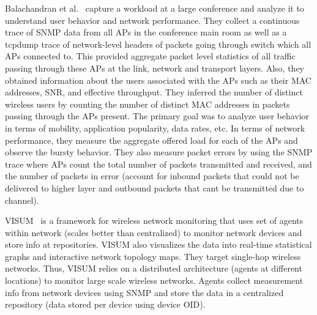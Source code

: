 Balachandran et al.~\cite{Balachandran-sigmetrics} capture a workload at a large conference and analyze it to understand user behavior and network performance. They collect a continuous trace of SNMP data from all APs in the conference main room as well as a tcpdump trace of network-level headers of packets going through switch which all APs connected to. This provided aggregate packet level statistics of all traffic passing through these APs at the link, network and transport layers. Also, they obtained information about the users associated with the APs such as their MAC addresses, SNR, and effective throughput. They inferred the number of distinct wireless users by counting the number of distinct MAC addresses in packets passing through the APs present. The primary goal was to analyze user behavior in terms of mobility, application popularity, data rates, etc. In terms of network performance, they measure the aggregate offered load for each of the APs and observe the bursty behavior. They also measure packet errors by using the SNMP trace where APs count the total number of packets transmitted and received, and the number of packets in error (account for inbound packets that could not be delivered to higher layer and outbound packets that cant be transmitted due to channel). 

VISUM~\cite{VISUM} is a framework for wireless network monitoring that uses set of agents within network (scales better than centralized) to monitor network devices and store info at repositories. VISUM also visualizes the data into real-time statistical graphs and interactive network topology maps. They target single-hop wireless networks.  Thus, VISUM relies on a distributed architecture (agents at different locations) to monitor large scale wireless networks. Agents collect measurement info from network devices using SNMP and store the data in a centralized repository (data stored per device using device OID).  
